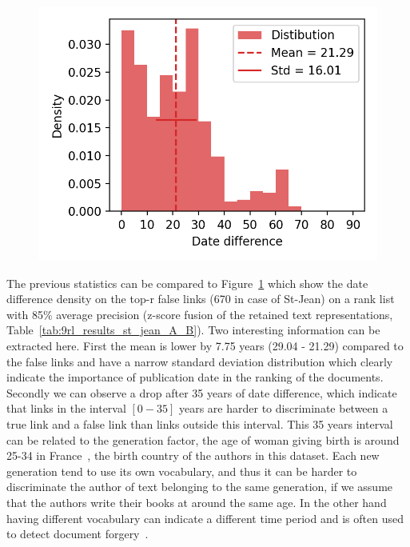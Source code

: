 \begin{figure}
  \label{fig:dates_differences_r_false}
  \includegraphics[width=\linewidth]{img/dates_differences_r_false.png}
\end{figure}

The previous statistics can be compared to Figure~\ref{fig:dates_differences_r_false} which show the date difference density on the top-r false links (670 in case of St-Jean) on a rank list with 85\% average precision (z-score fusion of the retained text representations, Table~\ref{tab:9rl_results_st_jean_A_B}).
Two interesting information can be extracted here.
First the mean is lower by 7.75 years (29.04 - 21.29) compared to the false links and have a narrow standard deviation distribution which clearly indicate the importance of publication date in the ranking of the documents.
Secondly we can observe a drop after 35 years of date difference, which indicate that links in the interval $\left[0-35\right]$ years are harder to discriminate between a true link and a false link than links outside this interval.
This 35 years interval can be related to the generation factor, the age of woman giving birth is around 25-34 in France~\cite{generations}, the birth country of the authors in this dataset.
Each new generation tend to use its own vocabulary, and thus it can be harder to discriminate the author of text belonging to the same generation, if we assume that the authors write their books at around the same age.
In the other hand having different vocabulary can indicate a different time period and is often used to detect document forgery~\cite{savoy_stylo}.
